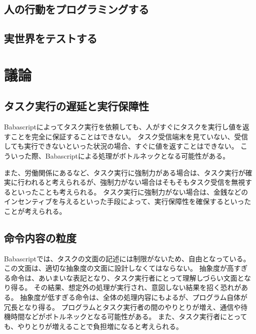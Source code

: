 \subsection{人の行動をプログラミングする}\label{ux4ebaux306eux884cux52d5ux3092ux30d7ux30edux30b0ux30e9ux30dfux30f3ux30b0ux3059ux308b}

\subsection{実世界をテストする}\label{ux5b9fux4e16ux754cux3092ux30c6ux30b9ux30c8ux3059ux308b}

\section{議論}\label{ux8b70ux8ad6}

\subsection{タスク実行の遅延と実行保障性}\label{ux30bfux30b9ux30afux5b9fux884cux306eux9045ux5ef6ux3068ux5b9fux884cux4fddux969cux6027}

Babascriptによってタスク実行を依頼しても、人がすぐにタスクを実行し値を返すことを完全に保証することはできない。
タスク受信端末を見ていない、受信しても実行できないといった状況の場合、すぐに値を返すことはできない。
こういった際、Babascriptによる処理がボトルネックとなる可能性がある。

また、労働関係にあるなど、タスク実行に強制力がある場合は、タスク実行が確実に行われると考えられるが、強制力がない場合はそもそもタスク受信を無視するといったことも考えられる。
タスク実行に強制力がない場合は、金銭などのインセンティブを与えるといった手段によって、実行保障性を確保するといったことが考えられる。

\subsection{命令内容の粒度}\label{ux547dux4ee4ux5185ux5bb9ux306eux7c92ux5ea6}

Babascriptでは、タスクの文面の記述には制限がないため、自由となっている。
この文面は、適切な抽象度の文面に設計しなくてはならない。
抽象度が高すぎる命令は、あいまいな表記となり、タスク実行者にとって理解しづらい文面となり得る。
その結果、想定外の処理が実行され、意図しない結果を招く恐れがある。
抽象度が低すぎる命令は、全体の処理内容にもよるが、プログラム自体が冗長となり得る。
プログラムとタスク実行者の間のやりとりが増え、通信や待機時間などがボトルネックとなる可能性がある。
また、タスク実行者にとっても、やりとりが増えることで負担増になると考えられる。

